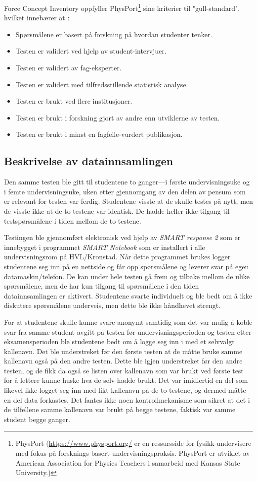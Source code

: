\documentclass[a4paper,norsk,12pt]{report}
\begin{document}
Force Concept Inventory oppfyller PhysPort\footnote{PhysPort (\url{https://www.physport.org/} er en ressursside for fysikk-undervisere med fokus på forsknings-basert undervisningspraksis. PhysPort er utviklet av American Association for Physics Teachers i samarbeid med Kansas State University.)} sine kriterier til "gull-standard", hvilket innebærer at \cite{2014arXiv1404.6500M}:
\begin{itemize}
\item
Spørsmålene er basert på forskning på hvordan studenter tenker.
\item
Testen er validert ved hjelp av student-intervjuer.
\item
Testen er validert av fag-eksperter.
\item
Testen er validert med tilfredsstillende statistisk analyse.
\item
Testen er brukt ved flere institusjoner.
\item
Testen er brukt i forskning gjort av andre enn utviklerne av testen.
\item
Testen er brukt i minst en fagfelle-vurdert publikasjon.
\end{itemize}

\subsection{Beskrivelse av datainnsamlingen}
Den samme testen ble gitt til studentene to ganger---i første undervisningsuke og i femte undervisningsuke, uken etter gjennomgang av den delen av pensum som er relevant for testen var ferdig. Studentene visste at de skulle testes på nytt, men de visste ikke at de to testene var identisk. De hadde heller ikke tilgang til testspørsmålene i tiden mellom de to testene. 

Testingen ble gjennomført elektronisk ved hjelp av \emph{SMART response 2} som er innebygget i programmet \emph{SMART Notebook} \cite{smart} som er installert i alle undervisningsrom på HVL/Kronstad. Når dette programmet brukes logger studentene seg inn på en nettside og får opp spørsmålene og leverer svar på egen datamaskin/telefon. De kan under hele testen gå frem og tilbake mellom de ulike spørsmålene, men de har kun tilgang til spørsmålene i den tiden datainnsamlingen er aktivert. Studentene svarte individuelt og ble bedt om å ikke diskutere spørsmålene underveis, men dette ble ikke håndhevet strengt. 

For at studentene skulle kunne svare anonymt samtidig som det var mulig å koble svar fra samme student avgitt på testen før undervisningsperioden og testen etter eksamensperioden ble studentene bedt om å logge seg inn i med et selvvalgt kallenavn. Det ble understreket før den første testen at de måtte bruke samme kallenavn også på den andre testen. Dette ble igjen understreket før den andre testen, og de fikk da også se listen over kallenavn som var brukt ved første test for å lettere kunne huske hva de selv hadde brukt. Det var imidlertid en del som likevel ikke logget seg inn med likt kallenavn på de to testene, og dermed måtte en del data forkastes. Det fantes ikke noen kontrollmekanisme som sikret at det i de tilfellene samme kallenavn var brukt på begge testene, faktisk var samme student begge ganger.
\end{document}
